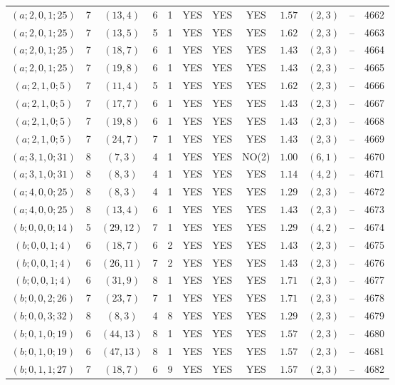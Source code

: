 \begin{longtable}{|c|c|c|c|c|c|c|c|c|c|c|c|}
$(a;2,0,1;25)$ & 7 & $(13,4)$ & 6 & 1 & YES & YES & YES & $1.57$ & $(2,3)$ & -- & 4662\\
$(a;2,0,1;25)$ & 7 & $(13,5)$ & 5 & 1 & YES & YES & YES & $1.62$ & $(2,3)$ & -- & 4663\\
$(a;2,0,1;25)$ & 7 & $(18,7)$ & 6 & 1 & YES & YES & YES & $1.43$ & $(2,3)$ & -- & 4664\\
$(a;2,0,1;25)$ & 7 & $(19,8)$ & 6 & 1 & YES & YES & YES & $1.43$ & $(2,3)$ & -- & 4665\\
$(a;2,1,0;5)$ & 7 & $(11,4)$ & 5 & 1 & YES & YES & YES & $1.62$ & $(2,3)$ & -- & 4666\\
$(a;2,1,0;5)$ & 7 & $(17,7)$ & 6 & 1 & YES & YES & YES & $1.43$ & $(2,3)$ & -- & 4667\\
$(a;2,1,0;5)$ & 7 & $(19,8)$ & 6 & 1 & YES & YES & YES & $1.43$ & $(2,3)$ & -- & 4668\\
$(a;2,1,0;5)$ & 7 & $(24,7)$ & 7 & 1 & YES & YES & YES & $1.43$ & $(2,3)$ & -- & 4669\\
$(a;3,1,0;31)$ & 8 & $(7,3)$ & 4 & 1 & YES & YES & NO(2) & $1.00$ & $(6,1)$ & -- & 4670\\
$(a;3,1,0;31)$ & 8 & $(8,3)$ & 4 & 1 & YES & YES & YES & $1.14$ & $(4,2)$ & -- & 4671\\
$(a;4,0,0;25)$ & 8 & $(8,3)$ & 4 & 1 & YES & YES & YES & $1.29$ & $(2,3)$ & -- & 4672\\
$(a;4,0,0;25)$ & 8 & $(13,4)$ & 6 & 1 & YES & YES & YES & $1.43$ & $(2,3)$ & -- & 4673\\
$(b;0,0,0;14)$ & 5 & $(29,12)$ & 7 & 1 & YES & YES & YES & $1.29$ & $(4,2)$ & -- & 4674\\
$(b;0,0,1;4)$ & 6 & $(18,7)$ & 6 & 2 & YES & YES & YES & $1.43$ & $(2,3)$ & -- & 4675\\
$(b;0,0,1;4)$ & 6 & $(26,11)$ & 7 & 2 & YES & YES & YES & $1.43$ & $(2,3)$ & -- & 4676\\
$(b;0,0,1;4)$ & 6 & $(31,9)$ & 8 & 1 & YES & YES & YES & $1.71$ & $(2,3)$ & -- & 4677\\
$(b;0,0,2;26)$ & 7 & $(23,7)$ & 7 & 1 & YES & YES & YES & $1.71$ & $(2,3)$ & -- & 4678\\
$(b;0,0,3;32)$ & 8 & $(8,3)$ & 4 & 8 & YES & YES & YES & $1.29$ & $(2,3)$ & -- & 4679\\
$(b;0,1,0;19)$ & 6 & $(44,13)$ & 8 & 1 & YES & YES & YES & $1.57$ & $(2,3)$ & -- & 4680\\
$(b;0,1,0;19)$ & 6 & $(47,13)$ & 8 & 1 & YES & YES & YES & $1.57$ & $(2,3)$ & -- & 4681\\
$(b;0,1,1;27)$ & 7 & $(18,7)$ & 6 & 9 & YES & YES & YES & $1.57$ & $(2,3)$ & -- & 4682\\

\end{longtable}
